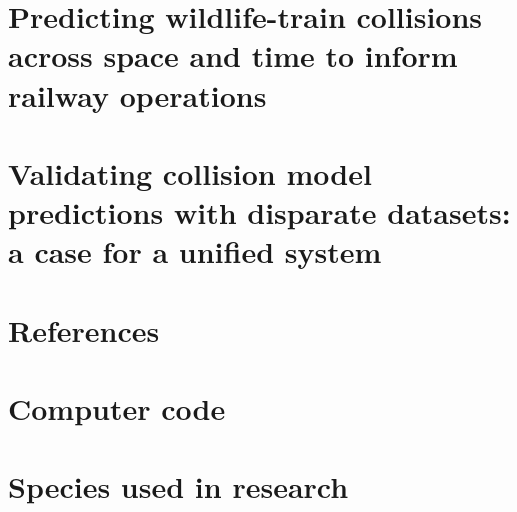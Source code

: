 \documentclass[titlesmallcaps,copyrightpage,examinerscopy]{uomthesis}
\begin{document}
%
\chapter{Predicting wildlife-train collisions across space and time to inform railway operations}\label{sec:train}
\clearpage{\pagestyle{empty}\cleardoublepage}

%
\chapter{Validating collision model predictions with disparate datasets: a case for a unified system}\label{sec:val}
\clearpage{\pagestyle{empty}\cleardoublepage}


\clearpage{\pagestyle{empty}\cleardoublepage}

%

{
\backmatter
\chapter{References}

\clearpage{\pagestyle{empty}\cleardoublepage}
}

\let\svaddcontentsline\addcontentsline %
\renewcommand\addcontentsline[3]{%
  \ifthenelse{\equal{#1}{lof}}{}%
  {\ifthenelse{\equal{#1}{lot}}{}{\svaddcontentsline{#1}{#2}{#3}}}}

\clearpage
\appendix
{}
\clearpage{\pagestyle{empty}\cleardoublepage}

%
\chapter{Computer code}\label{apx:A}
\clearpage{\pagestyle{empty}\cleardoublepage}

%
\chapter{Species used in research}\label{apx:B}
\clearpage{\pagestyle{empty}\cleardoublepage}
\end{document}
